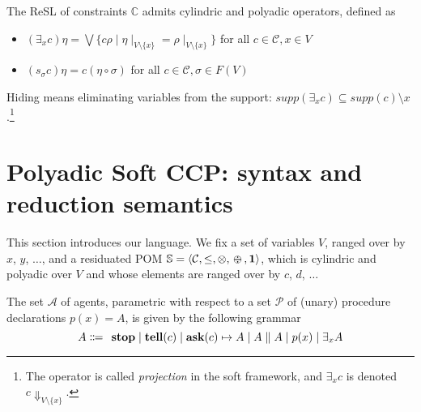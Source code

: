 \documentclass{llncs}
\def\1{{\mathbf 1}}
\newcommand{\tell}{{\bf tell}}
\newcommand{\ask}{{\bf ask}}
\newcommand{\ostop}{{\bf stop}}
\def\1{{\mathbf 1}}
\def\odiv{\, {\ominus\hspace{-7.7pt} \div} \,}
\begin{document}
\begin{lemma}
	The ReSL of constraints $\mathbb{C}$ admits cylindric and polyadic operators, defined as
	\begin{itemize}
		\item  $(\exists_x c) \eta = \bigvee \{c \rho \mid \eta\mid_{V \setminus \{x\}} = 
		\rho\mid_{V \setminus \{x\}}\}$ for all $c \in {\mathcal C}, x \in V$
		\item  $(s_\sigma c) \eta = c (\eta \circ \sigma)$ for all $c \in {\mathcal C}, \sigma \in F(V)$	
	\end{itemize}
\end{lemma}

Hiding means eliminating variables from the support:
$supp(\exists_x c) \subseteq supp({c}) \setminus {x}$.\footnote{The operator
	is called \emph{projection} in the soft framework,
	and $\exists_x c$ is denoted $c\Downarrow_{V\setminus \{x\}}$.}


\section{Polyadic Soft CCP: syntax and reduction semantics}\label{sec:detpolyadicCCP}
This section introduces our language.
We fix a set of variables $V$, ranged over by $x$, $y$, $\ldots$, and 
a residuated POM $\mathbb S = \langle {\mathcal C}, \leq, \otimes, \odiv, \1\rangle$, 
which is cylindric and polyadic over $V$ and whose elements
are ranged over by $c$, $d$, $\ldots$

\begin{definition}[Agents]%
The set $\mathcal{A}$ of agents, %
parametric with respect to a set $\mathcal{P}$ of (unary) procedure declarations $p(x) = A$,
is given by the following grammar
\[ A \Coloneqq \: \: \mathit{\ostop} \mid \textit{\tell}(c)  \mid \textit{\ask}(c) \mapsto A \mid A \parallel A \mid %
p(x) \mid \exists_x A\]  
\end{definition}
\end{document}
